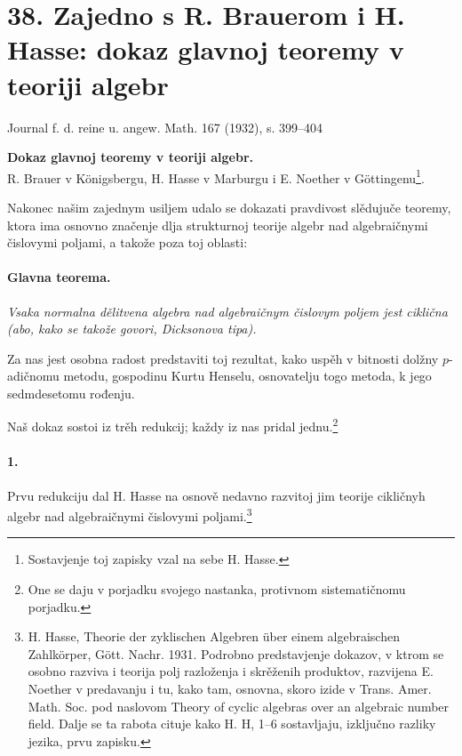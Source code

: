 \documentclass[11pt]{article}
\newcommand{\foreign}[1]{#1}
\begin{document}
\section*{38. Zajedno s R. Brauerom i H. Hasse: dokaz glavnoj teoremy v teoriji algebr}

\begin{center}
\foreign{Journal f. d. reine u. angew. Math. 167 (1932), s. 399--404}
\end{center}

\begin{center}
\textbf{Dokaz glavnoj teoremy v teoriji algebr.}\\[0.5em]
R. Brauer v Königsbergu, H. Hasse v Marburgu i E. Noether v Göttingenu\footnote{Sostavjenje toj zapisky vzal na sebe H. Hasse.}.
\end{center}

Nakonec našim zajednym usiljem udalo se dokazati pravdivost slědujuče teoremy, ktora ima osnovno značenje dlja strukturnoj teorije algebr nad algebraičnymi čislovymi poljami, a takože poza toj oblasti:

\paragraph{Glavna teorema.}
\emph{Vsaka normalna dělitvena algebra nad algebraičnym čislovym poljem jest ciklična (abo, kako se takože govori, Dicksonova tipa).}

Za nas jest osobna radost predstaviti toj rezultat, kako uspěh v bitnosti dolžny \(p\)-adičnomu metodu, gospodinu Kurtu Henselu, osnovatelju togo metoda, k jego sedmdesetomu rođenju.

Naš dokaz sostoi iz trěh redukcij; každy iz nas pridal jednu.\footnote{One se daju v porjadku svojego nastanka, protivnom sistematičnomu porjadku.}

\paragraph{1.}
Prvu redukciju dal H. Hasse na osnově nedavno razvitoj jim teorije cikličnyh algebr nad algebraičnymi čislovymi poljami.\footnote{\foreign{H. Hasse, Theorie der zyklischen Algebren über einem algebraischen Zahlkörper, Gött. Nachr. 1931.} Podrobno predstavjenje dokazov, v ktrom se osobno razviva i teorija polj razloženja i skrěženih produktov, razvijena E. Noether v predavanju i tu, kako tam, osnovna, skoro izide v \foreign{Trans. Amer. Math. Soc.} pod naslovom \foreign{Theory of cyclic algebras over an algebraic number field}. Dalje se ta rabota cituje kako H. H, 1--6 sostavljaju, izključno razliky jezika, prvu zapisku.}
\end{document}
